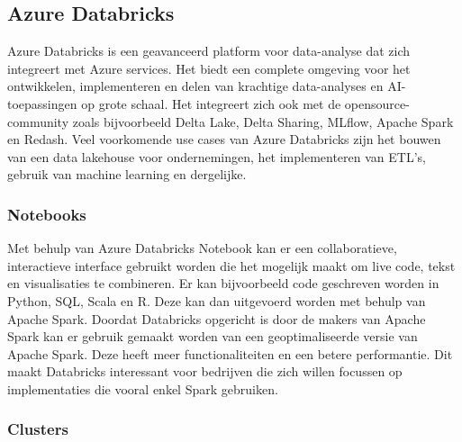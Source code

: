 %
%
%
%
%
%

\subsection{Azure Databricks}

Azure Databricks is een geavanceerd platform voor data-analyse dat zich integreert met Azure services. Het biedt een complete omgeving voor het ontwikkelen, implementeren en delen van krachtige data-analyses en AI-toepassingen op grote schaal. Het integreert zich ook met de opensource-community zoals bijvoorbeeld Delta Lake, Delta Sharing, MLflow, Apache Spark en Redash. Veel voorkomende use cases van Azure Databricks zijn het bouwen van een data lakehouse voor ondernemingen, het implementeren van ETL's, gebruik van machine learning en dergelijke.~\autocite{Microsoft2024}

\subsubsection{Notebooks}

Met behulp van Azure Databricks Notebook kan er een collaboratieve, interactieve interface gebruikt worden die het mogelijk maakt om live code, tekst en visualisaties te combineren. Er kan bijvoorbeeld code geschreven worden in Python, SQL, Scala en R. Deze kan dan uitgevoerd worden met behulp van Apache Spark. Doordat Databricks opgericht is door de makers van Apache Spark kan er gebruik gemaakt worden van een geoptimaliseerde versie van Apache Spark. Deze heeft meer functionaliteiten en een betere performantie. Dit maakt Databricks interessant voor bedrijven die zich willen focussen op implementaties die vooral enkel Spark gebruiken.~\autocite{Hill2023}

\subsubsection{Clusters}

